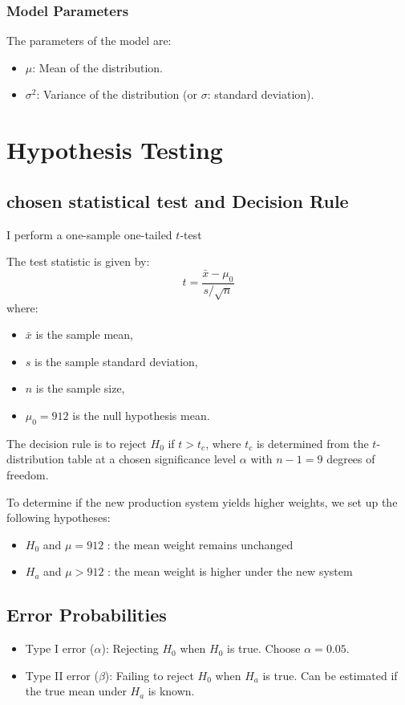 \subsubsection*{Model Parameters}
The parameters of the model are:
\begin{itemize}
    \item $\mu$: Mean of the distribution.
    \item $\sigma^2$: Variance of the distribution (or $\sigma$: standard deviation).
\end{itemize}

\section{Hypothesis Testing}

\subsection*{chosen statistical test and Decision Rule}
I perform a one-sample one-tailed $ t $-test


The test statistic is given by:
\begin{equation}
t = \frac{\bar{x} - \mu_0}{s / \sqrt{n}}
\end{equation}
where:
\begin{itemize}
    \item $\bar{x}$ is the sample mean,
    \item $s$ is the sample standard deviation,
    \item $n$ is the sample size,
    \item $\mu_{0} = 912$ is the null hypothesis mean.
\end{itemize}

The decision rule is to reject $H_{0}$ if $t>t_{c}$, where $ t_{c} $ is determined from the $ t $-distribution table at a chosen significance level $\alpha$ with $ n-1 = 9 $ degrees of freedom.

To determine if the new production system yields higher weights, we set up the following hypotheses:
\begin{itemize}
\item $H_{0}$ and $\mu = 912$ : the mean weight remains unchanged
\item $H_{a}$ and $\mu > 912$ :  the mean weight is higher under the new system
\end{itemize}


\subsection*{Error Probabilities}
\begin{itemize}
    \item Type I error ($\alpha$): Rejecting $H_0$ when $H_0$ is true. Choose $\alpha = 0.05$.
    \item Type II error ($\beta$): Failing to reject $H_0$ when $H_a$ is true. Can be estimated if the true mean under $H_a$ is known.
\end{itemize}

